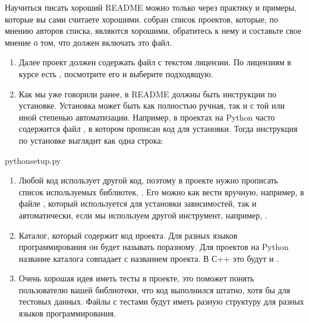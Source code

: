 \documentclass[letterpaper,10pt,russian]{sphinxmanual}
\begin{document}
\sphinxAtStartPar
{}

\sphinxAtStartPar
Научиться писать хороший README можно только через практику и примеры, которые вы сами считаете хорошими.  собран список проектов, которые, по мнению авторов списка, являются хорошими, обратитесь к нему и составьте свое мнение о том, что должен включать это файл.
\begin{enumerate}
%
\setcounter{enumi}{1}
\item {} 
\sphinxAtStartPar
Далее проект должен содержать файл  с текстом лицензии. По лицензиям в курсе есть , посмотрите его и выберите подходящую.

\item {} 
\sphinxAtStartPar
Как мы уже говорили ранее, в README должны быть инструкции по установке. Установка может быть как полностью ручная, так и с той или иной степенью автоматизации. Например, в проектах на Python часто содержится файл , в котором прописан код для установки. Тогда инструкция по установке выглядит как одна строка:

\end{enumerate}

\begin{sphinxVerbatim}[commandchars=\\\{\}]
pythonsetup.py
\end{sphinxVerbatim}
\begin{enumerate}
%
\setcounter{enumi}{3}
\item {} 
\sphinxAtStartPar
Любой код использует другой код, поэтому в проекте нужно прописать список используемых библиотек, . Его можно как вести вручную, например, в файле , который используется  для установки зависимостей, так и автоматически, если мы используем другой инструмент, например, .

\item {} 
\sphinxAtStartPar
Каталог, который содержит код проекта. Для разных языков программирования он будет называть по\sphinxhyphen{}разному. Для проектов на Python название каталога совпадает с названием проекта. В С++ это будут  и .

\item {} 
\sphinxAtStartPar
Очень хорошая идея иметь тесты в проекте, это поможет понять пользователю вашей библиотеки, что код выполнился штатно, хотя бы для тестовых данных. Файлы с тестами будут иметь разную структуру для разных языков программирования.

\end{enumerate}
\end{document}
